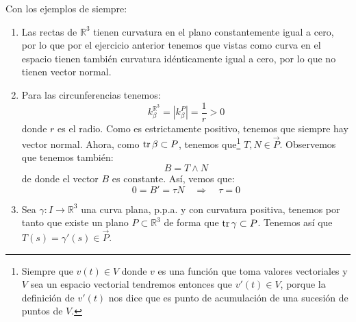 \begin{ejemplo}
    Con los ejemplos de siempre:
    \begin{enumerate}
        \item Las rectas de $\mathbb{R}^3$ tienen curvatura en el plano constantemente igual a cero, por lo que por el ejercicio anterior tenemos que vistas como curva en el espacio tienen también curvatura idénticamente igual a cero, por lo que no tienen vector normal.
        \item Para las circunferencias tenemos:
            \begin{equation*}
                k_{\beta}^{\mathbb{R}^3} = |k_{\beta}^P| = \frac{1}{r} > 0
            \end{equation*}
            donde $r$ es el radio. Como es estrictamente positivo, tenemos que siempre hay vector normal. Ahora, como $\operatorname{tr}\beta\subset P$, tenemos que\footnote{Siempre que $v(t)\in V$ donde $v$ es una función que toma valores vectoriales y $V$ sea un espacio vectorial tendremos entonces que $v'(t)\in V$, porque la definición de $v'(t)$ nos dice que es punto de acumulación de una sucesión de puntos de $V$.} $T, N \in \vec{P}$. Observemos que tenemos también:
            \begin{equation*}
                B = T\land N
            \end{equation*}
            de donde el vector $B$ es constante. Así, vemos que:
            \begin{equation*}
                0 = B' = \tau N \quad\Longrightarrow\quad\tau = 0
            \end{equation*}
        \item Sea $\gamma:I\to \mathbb{R}^3$ una curva plana, p.p.a. y con curvatura positiva, tenemos por tanto que existe un plano $P\subset\mathbb{R}^3$ de forma que $\operatorname{tr} \gamma\subset P$. Tenemos así que $T(s) = \gamma'(s) \in \vec{P}$. %


\end{enumerate}
\end{ejemplo}
